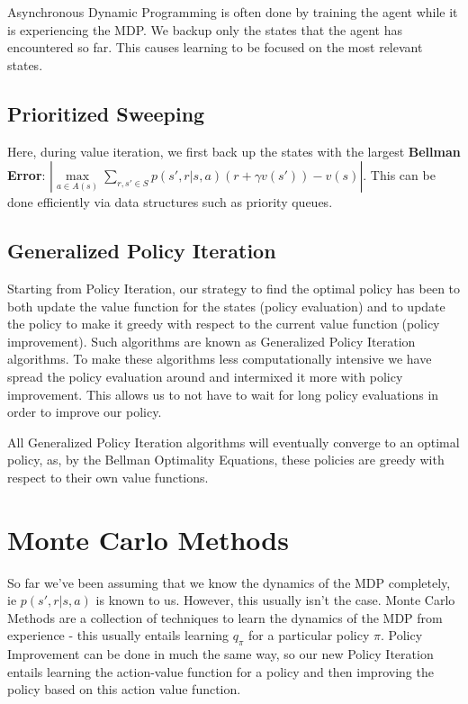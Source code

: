 \documentclass[12pt]{report}
\begin{document}
Asynchronous Dynamic Programming is often done by training the agent while it is experiencing the MDP. We backup only the states that the agent has encountered so far. This causes learning to be focused on the most relevant states.

\section{Prioritized Sweeping}
Here, during value iteration, we first back up the states with the largest \textbf{Bellman Error}: $\left|\max\limits_{a \in A(s)}\sum\limits_{r, s' \in S} p(s', r | s, a)(r + \gamma v(s')) - v(s)\right|$. This can be done efficiently via data structures such as priority queues.

\section{Generalized Policy Iteration}
Starting from Policy Iteration, our strategy to find the optimal policy has been to both update the value function for the states (policy evaluation) and to update the policy to make it greedy with respect to the current value function (policy improvement). Such algorithms are known as 
Generalized Policy Iteration algorithms. To make these algorithms less computationally intensive we have spread the policy evaluation around and intermixed it more with policy improvement. This allows us to not have to wait for long policy evaluations in order to improve our policy.

All Generalized Policy Iteration algorithms will eventually converge to an optimal policy, as, by the Bellman Optimality Equations, these policies are greedy with respect to their own value functions.


\chapter{Monte Carlo Methods}

So far we've been assuming that we know the dynamics of the MDP completely, ie $p(s', r | s, a)$ is known to us. However, this usually isn't the case. Monte Carlo Methods are a collection of techniques to learn the dynamics of the MDP from experience - this usually entails learning $q_{\pi}$  for a particular policy $\pi$. Policy Improvement can be done in much the same way, so our new Policy Iteration entails learning the action-value function for a policy and then improving the policy based on this action value function.
\end{document}
